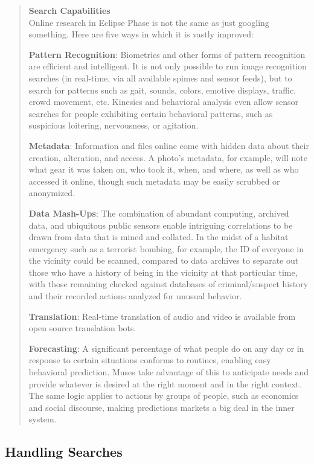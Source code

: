 \begin{quotation} \textbf{Search Capabilities} \\ Online research in Eclipse Phase is not the same as just googling something. Here are five ways in which it is vastly improved: 

\textbf{Pattern Recognition}: Biometrics and other forms of pattern recognition are efficient and intelligent. It is not only possible to run image recognition searches (in real-time, via all available spimes and sensor feeds), but to search for patterns such as gait, sounds, colors, emotive displays, traffic, crowd movement, etc. Kinesics and behavioral analysis even allow sensor searches for people exhibiting certain behavioral patterns, such as suspicious loitering, nervousness, or agitation. 

\textbf{Metadata}: Information and files online come with hidden data about their creation, alteration, and access. A photo’s metadata, for example, will note what gear it was taken on, who took it, when, and where, as well as who accessed it online, though such metadata may be easily scrubbed or anonymized. 

\textbf{Data Mash-Ups}: The combination of abundant computing, archived data, and ubiquitous public sensors enable intriguing correlations to be drawn from data that is mined and collated. In the midst of a habitat emergency such as a terrorist bombing, for example, the ID of everyone in the vicinity could be scanned, compared to data archives to separate out those who have a history of being in the vicinity at that particular time, with those remaining checked against databases of criminal/suspect history and their recorded actions analyzed for unusual behavior. 

\textbf{Translation}: Real-time translation of audio and video is available from open source translation bots. 

\textbf{Forecasting}: A significant percentage of what people do on any day or in response to certain situations conforms to routines, enabling easy behavioral prediction. Muses take advantage of this to anticipate needs and provide whatever is desired at the right moment and in the right context. The same logic applies to actions by groups of people, such as economics and social discourse, making predictions markets a big deal in the inner system. \end{quotation} 

\subsection{Handling Searches} 

